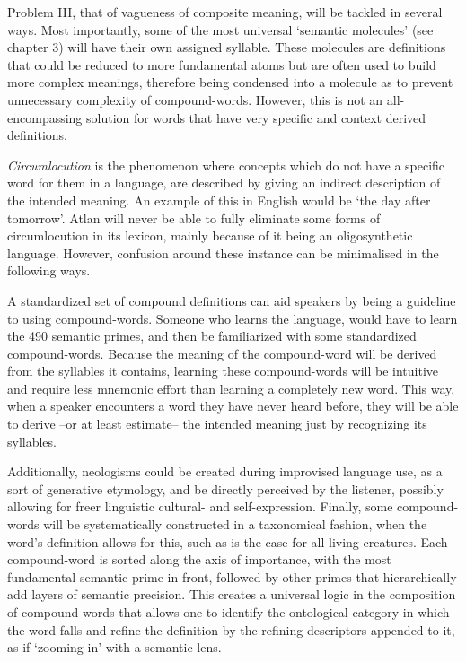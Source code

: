 Problem III, that of vagueness of composite meaning, will be tackled in several ways. Most importantly, some of the most universal ‘semantic molecules’ (see chapter 3) will have their own assigned syllable. These molecules are definitions that could be reduced to more fundamental atoms but are often used to build more complex meanings, therefore being condensed into a molecule as to prevent unnecessary complexity of compound-words. However, this is not an all-encompassing solution for words that have very specific and context derived definitions. 

{\it Circumlocution} is the phenomenon where concepts which do not have a specific word for them in a language, are described by giving an indirect description of the intended meaning. An example of this in English would be ‘the day after tomorrow’. Atlan will never be able to fully eliminate some forms of circumlocution in its lexicon, mainly because of it being an oligosynthetic language. However, confusion around  these instance can be minimalised in the following ways.  

A standardized set of compound  definitions can aid speakers by being a guideline to using compound-words. Someone who learns the language, would have to learn the 490 semantic primes, and then be familiarized with some standardized compound-words. Because the meaning of the compound-word will be derived from the syllables it contains, learning these compound-words will be intuitive and require less mnemonic effort than learning a completely new word. This way, when a speaker encounters a word they have never heard before, they will be able to derive --or at least estimate-- the intended meaning just by recognizing its syllables.

Additionally, neologisms could be created during improvised language use, as a sort of generative etymology, and be directly perceived by the listener, possibly allowing for freer linguistic cultural- and self-expression. Finally, some compound-words will be systematically constructed in a taxonomical fashion, when the word’s definition allows for this, such as is the case for all living creatures. Each compound-word is sorted along the axis of importance, with the most fundamental semantic prime in front, followed by other primes that hierarchically add layers of semantic precision. This creates a universal logic in the composition of compound-words that allows one to identify the ontological category in which the word falls and refine the definition by the refining descriptors appended to it, as if ‘zooming in’ with a semantic lens.


